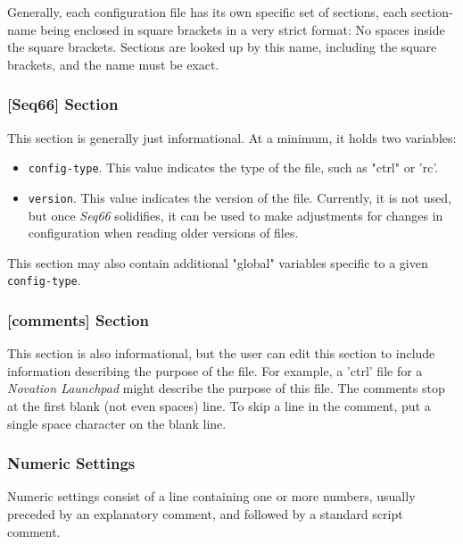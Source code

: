    Generally, each configuration file has its own specific set
   of sections, each section-name being enclosed in square brackets in a very
   strict format:  No spaces inside the square brackets.  Sections are looked up
   by this name, including the square brackets, and the name must be exact.

\subsubsection{[Seq66] Section}
\label{subsec:configuration_common_seq66_section}

   This section is generally just informational.  At a minimum, it holds two
   variables:

   \begin{itemize}
      \item \texttt{config-type}.  This value indicates the type of the file,
      such as "ctrl" or 'rc'.
      \item \texttt{version}.  This value indicates the version of the file.
      Currently, it is not used, but once \textsl{Seq66} solidifies,
      it can be used to make adjustments for changes in configuration when
      reading older versions of files.
   \end{itemize}

   This section may also contain additional "global"
   variables specific to a given \texttt{config-type}.

\subsubsection{[comments] Section}
\label{subsec:configuration_common_comments_section}

   This section is also informational, but the user can edit this section to
   include information describing the purpose of the file.  For example, a
   'ctrl' file for a \textsl{Novation Launchpad} might describe the purpose of
   this file.  The comments stop at the first blank (not even spaces) line.  To
   skip a line in the comment, put a single space character on the blank line.

\subsubsection{Numeric Settings}
\label{subsec:configuration_common_numeric_settings}

   Numeric settings consist of a line containing one or more numbers, usually
   preceded by an explanatory comment, and followed by a standard script
   comment.


